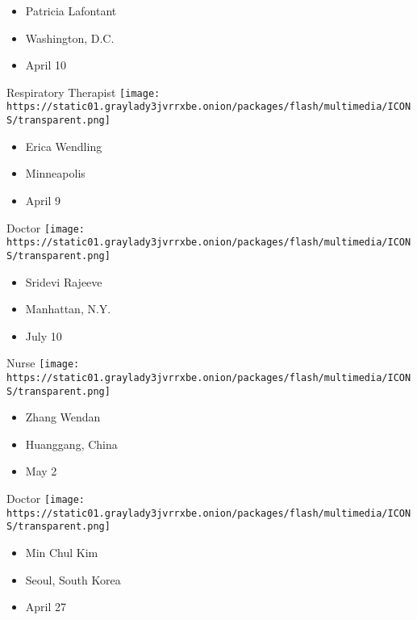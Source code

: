 \begin{itemize}
\tightlist
\item
  Patricia Lafontant
\item
  Washington, D.C.
\item
  April 10
\end{itemize}

\protect\hyperlink{item-erica-wendling}{}

Respiratory Therapist
\texttt{[image: https://static01.graylady3jvrrxbe.onion/packages/flash/multimedia/ICONS/transparent.png]}

\begin{itemize}
\tightlist
\item
  Erica Wendling
\item
  Minneapolis
\item
  April 9
\end{itemize}

\protect\hyperlink{item-sridevi-rajeeve}{}

Doctor
\texttt{[image: https://static01.graylady3jvrrxbe.onion/packages/flash/multimedia/ICONS/transparent.png]}

\begin{itemize}
\tightlist
\item
  Sridevi Rajeeve
\item
  Manhattan, N.Y.
\item
  July 10
\end{itemize}

\protect\hyperlink{item-zhang-wendan}{}

Nurse
\texttt{[image: https://static01.graylady3jvrrxbe.onion/packages/flash/multimedia/ICONS/transparent.png]}

\begin{itemize}
\tightlist
\item
  Zhang Wendan
\item
  Huanggang, China
\item
  May 2
\end{itemize}

\protect\hyperlink{item-min-chul-kim}{}

Doctor
\texttt{[image: https://static01.graylady3jvrrxbe.onion/packages/flash/multimedia/ICONS/transparent.png]}

\begin{itemize}
\tightlist
\item
  Min Chul Kim
\item
  Seoul, South Korea
\item
  April 27
\end{itemize}

